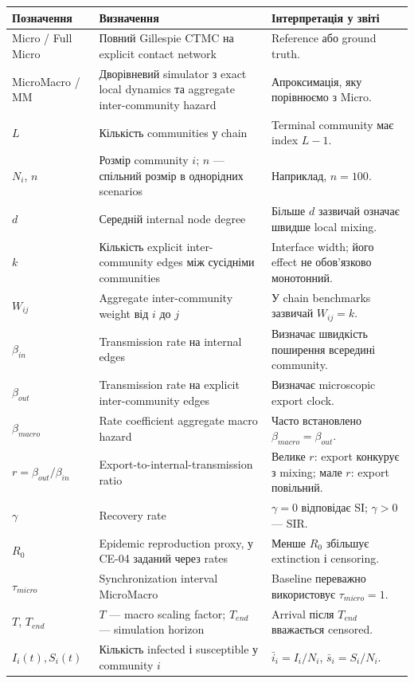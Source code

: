 \documentclass[11pt,a4paper]{article}
\begin{document}
\small
\setlength{\tabcolsep}{4pt}
\begin{longtable}{p{3.0cm}p{7.0cm}p{4.3cm}}
\toprule
Позначення & Визначення & Інтерпретація у звіті\\
\midrule
\endhead
Micro / Full Micro & Повний Gillespie CTMC на explicit contact network & Reference або ground truth.\\
MicroMacro / MM & Дворівневий simulator з exact local dynamics та aggregate inter-community hazard & Апроксимація, яку порівнюємо з Micro.\\
$L$ & Кількість communities у chain & Terminal community має index $L-1$.\\
$N_i$, $n$ & Розмір community $i$; $n$ --- спільний розмір в однорідних scenarios & Наприклад, $n=100$.\\
$d$ & Середній internal node degree & Більше $d$ зазвичай означає швидше local mixing.\\
$k$ & Кількість explicit inter-community edges між сусідніми communities & Interface width; його effect не обов'язково монотонний.\\
$W_{ij}$ & Aggregate inter-community weight від $i$ до $j$ & У chain benchmarks зазвичай $W_{ij}=k$.\\
$\beta_{in}$ & Transmission rate на internal edges & Визначає швидкість поширення всередині community.\\
$\beta_{out}$ & Transmission rate на explicit inter-community edges & Визначає microscopic export clock.\\
$\beta_{macro}$ & Rate coefficient aggregate macro hazard & Часто встановлено $\beta_{macro}=\beta_{out}$.\\
$r=\beta_{out}/\beta_{in}$ & Export-to-internal-transmission ratio & Велике $r$: export конкурує з mixing; мале $r$: export повільний.\\
$\gamma$ & Recovery rate & $\gamma=0$ відповідає SI; $\gamma>0$ --- SIR.\\
$R_0$ & Epidemic reproduction proxy, у CE-04 заданий через rates & Менше $R_0$ збільшує extinction і censoring.\\
$\tau_{micro}$ & Synchronization interval MicroMacro & Baseline переважно використовує $\tau_{micro}=1$.\\
$T$, $T_{end}$ & $T$ --- macro scaling factor; $T_{end}$ --- simulation horizon & Arrival після $T_{end}$ вважається censored.\\
$I_i(t),S_i(t)$ & Кількість infected і susceptible у community $i$ & $\bar i_i=I_i/N_i$, $\bar s_i=S_i/N_i$.\\

\end{longtable}
\end{document}
